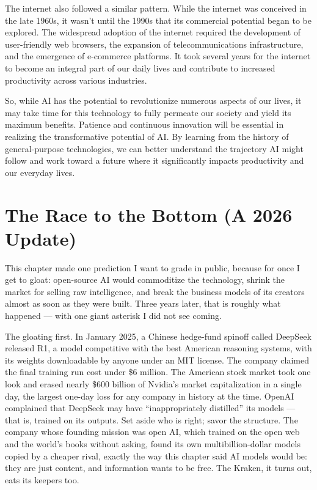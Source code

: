 The internet also followed a similar pattern. While the internet was conceived in the late 1960s, it wasn’t until the 1990s that its commercial potential began to be explored. The widespread adoption of the internet required the development of user-friendly web browsers, the expansion of telecommunications infrastructure, and the emergence of e-commerce platforms. It took several years for the internet to become an integral part of our daily lives and contribute to increased productivity across various industries.

So, while AI has the potential to revolutionize numerous aspects of our lives, it may take time for this technology to fully permeate our society and yield its maximum benefits. Patience and continuous innovation will be essential in realizing the transformative potential of AI. By learning from the history of general-purpose technologies, we can better understand the trajectory AI might follow and work toward a future where it significantly impacts productivity and our everyday lives.

\section{The Race to the Bottom (A 2026 Update)}

This chapter made one prediction I want to grade in public, because for once I get to gloat: open-source AI would commoditize the technology, shrink the market for selling raw intelligence, and break the business models of its creators almost as soon as they were built. Three years later, that is roughly what happened --- with one giant asterisk I did not see coming.

The gloating first. In January 2025, a Chinese hedge-fund spinoff called DeepSeek released R1, a model competitive with the best American reasoning systems, with its weights downloadable by anyone under an MIT license. The company claimed the final training run cost under \$6 million. The American stock market took one look and erased nearly \$600 billion of Nvidia's market capitalization in a single day, the largest one-day loss for any company in history at the time. OpenAI complained that DeepSeek may have ``inappropriately distilled'' its models --- that is, trained on its outputs. Set aside who is right; savor the structure. The company whose founding mission was open AI, which trained on the open web and the world's books without asking, found its own multibillion-dollar models copied by a cheaper rival, exactly the way this chapter said AI models would be: they are just content, and information wants to be free. The Kraken, it turns out, eats its keepers too.

